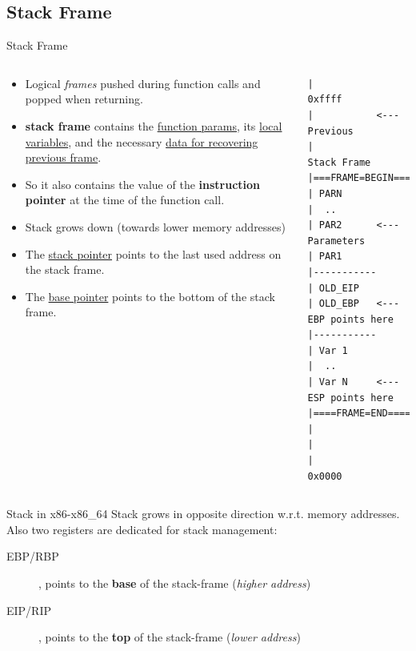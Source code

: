 \subsection{Stack Frame}
\begin{frame}{Stack Frame}

\begin{columns}[T]
	\begin{column}{.6\textwidth}
	\begin{itemize}
\item Logical \emph{frames} pushed during function calls and popped when returning.
\item {\bf stack frame} contains the \underline{function params}, its \underline{local variables}, and the necessary \underline{data for recovering previous frame}.
\item So it also contains the value of the {\bf instruction pointer} at the time of the function call.
\item Stack grows down (towards lower memory addresses)
\item The \underline{stack pointer} points to the last used address on the stack frame.
\item The \underline{base pointer} points to the bottom of the stack frame.
\end{itemize}
	\end{column}
	\begin{column}{.3\textwidth}
	\tiny\begin{verbatim}
|                              0xffff
|           <--- Previous
|                Stack Frame
|===FRAME=BEGIN===
| PARN
|  ..
| PAR2      <--- Parameters
| PAR1
|-----------
| OLD_EIP
| OLD_EBP   <--- EBP points here
|-----------
| Var 1
|  ..
| Var N     <--- ESP points here
|====FRAME=END====
|
|
|                             0x0000
	\end{verbatim}


	\end{column}
\end{columns}



\framebreak

\begin{block}{Stack in x86-x86\_64}
Stack grows in opposite direction w.r.t. memory addresses.\\
Also two registers are dedicated for stack management:
\begin{description}
\item[EBP/RBP], points to the {\bf base} of the stack-frame (\emph{higher address})
\item[EIP/RIP], points to the {\bf top} of the stack-frame (\emph{lower address})
\end{description}
\end{block}


\end{frame}
